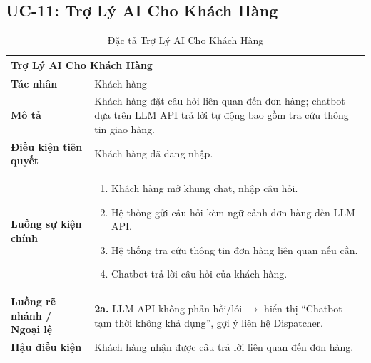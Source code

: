 \subsection{UC-11: Trợ Lý AI Cho Khách Hàng}
\begin{table}[H]
  \centering
  \begin{tabularx}{\textwidth}{|l|X|}
    \hline
    \multicolumn{2}{|l|}{\textbf{Trợ Lý AI Cho Khách Hàng}} \\
    \hline
    \textbf{Tác nhân}           & Khách hàng \\ \hline
    \textbf{Mô tả}              & Khách hàng đặt câu hỏi liên quan đến đơn hàng; chatbot dựa trên LLM API trả lời tự động bao gồm tra cứu thông tin giao hàng. \\ \hline
    \textbf{Điều kiện tiên quyết} & Khách hàng đã đăng nhập. \\ \hline
    \textbf{Luồng sự kiện chính} &
      \begin{enumerate}[leftmargin=*, nosep, topsep=0pt]
        \item Khách hàng mở khung chat, nhập câu hỏi.
        \item Hệ thống gửi câu hỏi kèm ngữ cảnh đơn hàng đến LLM API.
        \item Hệ thống tra cứu thông tin đơn hàng liên quan nếu cần.
        \item Chatbot trả lời câu hỏi của khách hàng.
      \end{enumerate} \\ \hline
    \textbf{Luồng rẽ nhánh / Ngoại lệ} &
      \textbf{2a.} LLM API không phản hồi/lỗi $\rightarrow$ hiển thị ``Chatbot tạm thời không khả dụng'', gợi ý liên hệ Dispatcher. \\ \hline
    \textbf{Hậu điều kiện}      & Khách hàng nhận được câu trả lời liên quan đến đơn hàng. \\
    \hline
  \end{tabularx}
  \caption{Đặc tả Trợ Lý AI Cho Khách Hàng}
  \label{tab:uc11}
\end{table}


